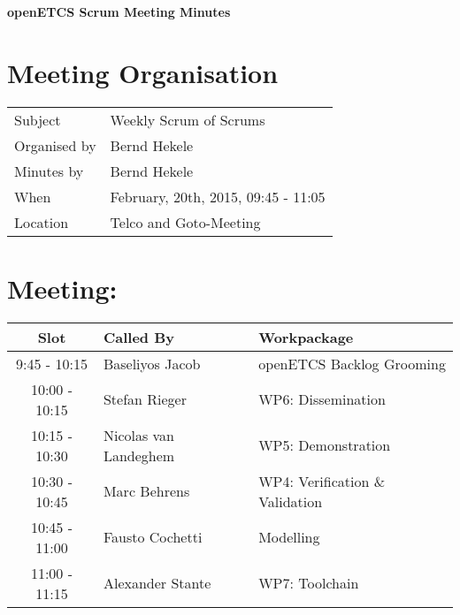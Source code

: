 \documentclass[a4paper, 11pt]{article}
\begin{document}
{\begin{center}\huge\bf openETCS Scrum Meeting Minutes\end{center}}
\section{Meeting Organisation}

\renewcommand{\arraystretch}{1.5}
\begin{supertabular}{m{.2\textwidth}m{.8\textwidth}}
Subject & Weekly Scrum of Scrums\\
Organised by &Bernd Hekele\\
Minutes by & Bernd Hekele\\
When & February, 20th, 2015, 09:45 - 11:05\\
Location & Telco and Goto-Meeting\\
\end{supertabular}

\renewcommand{\arraystretch}{1.0}
\section{Meeting:}

\begin{tabular}{|c|l|l|}
\hline
\textbf{Slot} &  \textbf{Called By} & \textbf{Workpackage} \\
\hline  
9:45 - 10:15 & Baseliyos Jacob & openETCS Backlog Grooming  \\\hline
10:00 - 10:15 & Stefan Rieger & WP6: Dissemination \\\hline  
10:15 - 10:30 & Nicolas van Landeghem & WP5: Demonstration \\\hline  
10:30 - 10:45 & Marc Behrens & WP4: Verification \& Validation \\\hline  
10:45 - 11:00 & Fausto Cochetti & Modelling \\\hline  
11:00 - 11:15 & Alexander Stante  & WP7: Toolchain \\\hline
\end{tabular}
\end{document}
